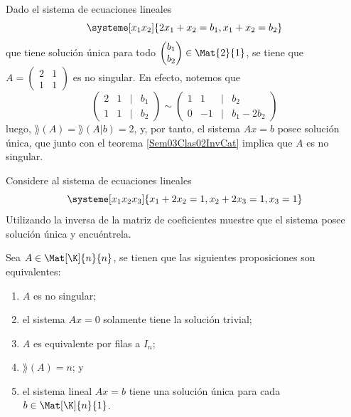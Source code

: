 \documentclass[compacto,10pt]{pubciencias-notas}
\begin{document}
\begin{ejem}\hspace{0pt}\label{Sem03Clas02EjemPartB} 
Dado el sistema de ecuaciones lineales
\[
    \systeme[x_1 x_2]{2x_1 +x_2 =b_{1},
        x_1 +x_2 = b_{2}}
\]
que tiene solución única para todo $\begin{pmatrix}b_{1}\\b_{2}\end{pmatrix}\in\Mat{2}{1}$, se tiene que 
$A = \begin{pmatrix}2&1\\1&1\end{pmatrix}$ es no singular. En efecto, notemos que 
\[
    \begin{pmatrix}
    2&1&|&b_{1}\\
    1&1&|&b_{2}
    \end{pmatrix}
    \sim
    \begin{pmatrix}
    1&1&|&b_{2}\\
    0&-1&|&b_{1} - 2b_{2}
    \end{pmatrix}
\]
luego, $\rang(A) = \rang(A|b) = 2$, y, por tanto, el sistema $Ax = b$ posee solución única, que junto con el teorema \ref{Sem03Clas02InvCat} implica que $A$ es no singular.
\end{ejem}

\begin{ejer}\hspace{0pt} 
Considere al sistema de ecuaciones lineales
\[
    \systeme[x_1 x_2 x_3]{x_1 +2x_2 =1,
        x_2 +2x_3 = 1,
        x_3 = 1}
\]
Utilizando la inversa de la matriz de coeficientes muestre que el sistema posee solución única y encuéntrela.
\end{ejer}

\begin{prop}\label{Sem03Clas02EquivInv}
    Sea $A \in \Mat[\K]{n}{n}$, se tienen que las siguientes proposiciones son equivalentes:
    \begin{enumerate}
    \item[$a)$] 
        $A$ es no singular;
    \item[$b)$] 
        el sistema $Ax=0$ solamente tiene la solución trivial;
    \item[$c)$] 
        $A$ es equivalente por filas a $I_n$;
    \item[$d)$] 
        $\rang(A)=n$; y 
    \item[$e)$] 
        el sistema lineal $Ax=b$ tiene una solución única para cada $b \in \Mat[\K]{n}{1}$. 
    \end{enumerate}
\end{prop}
\end{document}
